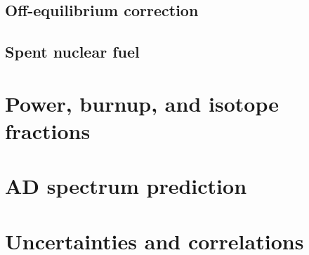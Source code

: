 \documentclass[../thesis.tex]{subfiles}
\begin{document}
\subsection{Off-equilibrium correction}
\label{sec:offeqcorr}

\subsection{Spent nuclear fuel}
\label{sec:snfcorr}

\section{Power, burnup, and isotope fractions}
\label{sec:reacpow}

\section{AD spectrum prediction}
\label{sec:adspectra}

\section{Uncertainties and correlations}
\label{sec:reacunccorr}
\end{document}
